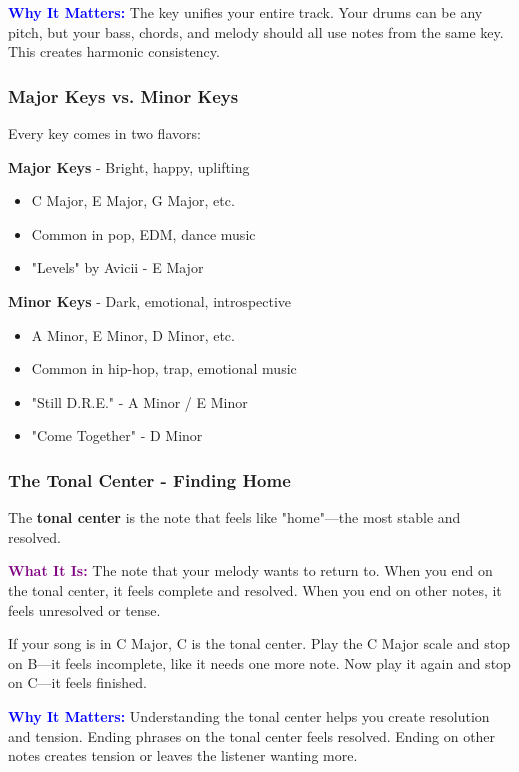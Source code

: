 \documentclass[11pt,letterpaper]{article}
\newcommand{\purple}[1]{\textcolor{purple}{\textbf{#1}}}
\newcommand{\bluepurple}[1]{\textcolor{blue}{\textbf{#1}}}
\begin{document}
\textbf{\bluepurple{Why It Matters:}} The key unifies your entire track. Your drums can be any pitch, but your bass, chords, and melody should all use notes from the same key. This creates harmonic consistency.

\subsubsection{Major Keys vs. Minor Keys}

Every key comes in two flavors:

\textbf{Major Keys} - Bright, happy, uplifting
\begin{itemize}[leftmargin=*]
\item C Major, E Major, G Major, etc.
\item Common in pop, EDM, dance music
\item "Levels" by Avicii - E Major
\end{itemize}

\textbf{Minor Keys} - Dark, emotional, introspective
\begin{itemize}[leftmargin=*]
\item A Minor, E Minor, D Minor, etc.
\item Common in hip-hop, trap, emotional music
\item "Still D.R.E." - A Minor / E Minor
\item "Come Together" - D Minor
\end{itemize}

\subsubsection{The Tonal Center - Finding Home}

The \textbf{tonal center} is the note that feels like "home"—the most stable and resolved.

\textbf{\purple{What It Is:}} The note that your melody wants to return to. When you end on the tonal center, it feels complete and resolved. When you end on other notes, it feels unresolved or tense.

If your song is in C Major, C is the tonal center. Play the C Major scale and stop on B—it feels incomplete, like it needs one more note. Now play it again and stop on C—it feels finished.

\textbf{\bluepurple{Why It Matters:}} Understanding the tonal center helps you create resolution and tension. Ending phrases on the tonal center feels resolved. Ending on other notes creates tension or leaves the listener wanting more.
\end{document}
